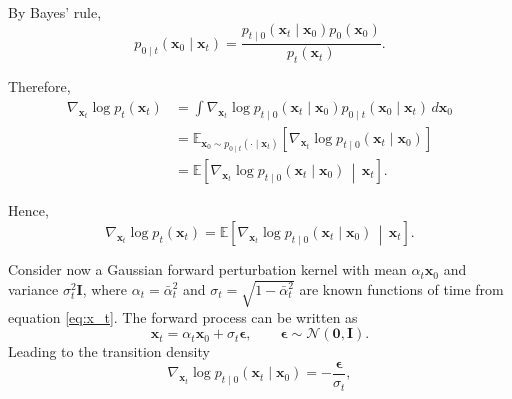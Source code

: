 \begin{compactproof}[title={Proof}]
By Bayes' rule,
\begin{equation*}
p_{0\mid t}(\mathbf{x}_0\mid \mathbf{x}_t)
=
\frac{
p_{t\mid 0}(\mathbf{x}_t\mid \mathbf{x}_0)
p_0(\mathbf{x}_0)
}{
p_t(\mathbf{x}_t)
}.
\end{equation*}

Therefore,
\begin{align*}
\nabla_{\mathbf{x}_t}\log p_t(\mathbf{x}_t)
&=
\int
\nabla_{\mathbf{x}_t}
\log p_{t\mid 0}(\mathbf{x}_t\mid \mathbf{x}_0)
p_{0\mid t}(\mathbf{x}_0\mid \mathbf{x}_t)
\,d\mathbf{x}_0
\\
&=
\mathbb{E}_{\mathbf{x}_0\sim
p_{0\mid t}(\cdot\mid\mathbf{x}_t)}
\left[
\nabla_{\mathbf{x}_t}
\log p_{t\mid 0}(\mathbf{x}_t\mid \mathbf{x}_0)
\right]
\\
&=
\mathbb{E}
\left[
\nabla_{\mathbf{x}_t}
\log p_{t\mid 0}(\mathbf{x}_t\mid \mathbf{x}_0)
\,\middle|\,
\mathbf{x}_t
\right].
\end{align*}

Hence,
\begin{equation*}
\boxed{
\nabla_{\mathbf{x}_t}\log p_t(\mathbf{x}_t)
=
\mathbb{E}
\left[
\nabla_{\mathbf{x}_t}
\log p_{t\mid 0}(\mathbf{x}_t\mid \mathbf{x}_0)
\,\middle|\,
\mathbf{x}_t
\right].
}
\end{equation*}
\end{compactproof}




Consider now a Gaussian forward perturbation kernel with mean $\alpha_t\mathbf{x}_0$ and variance $\sigma_t^2\mathbf{I}$, where $\alpha_t=\bar{\alpha}_t^2$ and $\sigma_t = \sqrt{1 - \bar{\alpha}_t^2}$ are known functions of time from equation \eqref{eq:x_t}. The forward process can be written as
\begin{equation*}
\mathbf{x}_t
=
\alpha_t\mathbf{x}_0
+
\sigma_t\boldsymbol{\epsilon},
\qquad
\boldsymbol{\epsilon}\sim\mathcal{N}(\mathbf{0},\mathbf{I}).
\end{equation*}
Leading to the transition density
\begin{equation}
    \nabla_{\mathbf{x}_t}
    \log p_{t\mid 0}(\mathbf{x}_t\mid\mathbf{x}_0)
    =
    -\frac{\boldsymbol{\epsilon}}{\sigma_t},
\end{equation}


